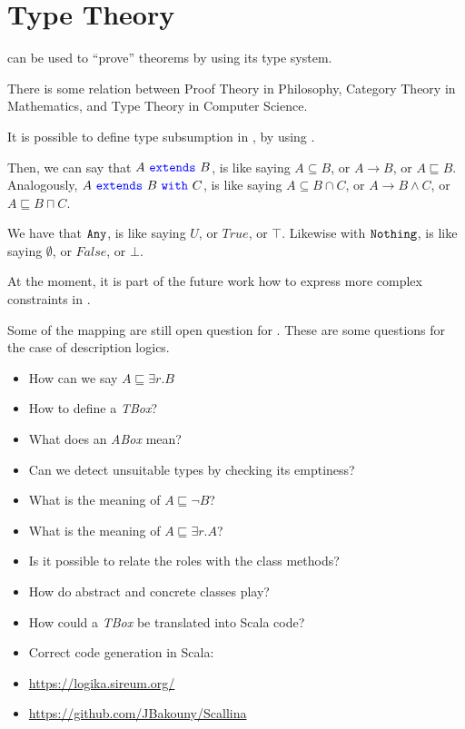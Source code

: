\section{Type Theory}

\Soda can be used to ``prove'' theorems by using its type system.

There is some relation between Proof Theory in Philosophy, Category Theory in Mathematics, and Type Theory in Computer Science.

It is possible to define type subsumption in \Soda, by using \sextends.

Then, we can say that $A \ \sextends\ B$, is like saying $A \subseteq B$, or $A \to B$, or $A \sqsubseteq B$.
Analogously, $A \ \sextends\ B \ \swith\ C$, is like saying $A \subseteq B \cap C $, or $A \to B \land C$, or $A \sqsubseteq B \sqcap C$.

We have that $\texttt{{Any}}$, is like saying $U$, or $True$, or $\top$.
Likewise with $\texttt{{Nothing}}$, is like saying $\emptyset$, or $False$, or $\bot$.

At the moment, it is part of the future work how to express more complex constraints in \Soda.

Some of the mapping are still open question for \Soda.
These are some questions for the case of description logics.

\begin{itemize}
    \item How can we say $A \sqsubseteq \exists r. B $
    \item How to define a \textit{TBox}?
    \item What does an \textit{ABox} mean?
    \item Can we detect unsuitable types by checking its emptiness?
    \item What is the meaning of $A \sqsubseteq \lnot B$?
    \item What is the meaning of $A \sqsubseteq \exists r. A$?
    \item Is it possible to relate the roles with the class methods?
    \item How do abstract and concrete classes play?
    \item How could a \textit{TBox} be translated into Scala code?
\end{itemize}

\begin{itemize}
    \item Correct code generation in Scala:
    \item \url{https://logika.sireum.org/}
    \item \url{https://github.com/JBakouny/Scallina}
\end{itemize}

